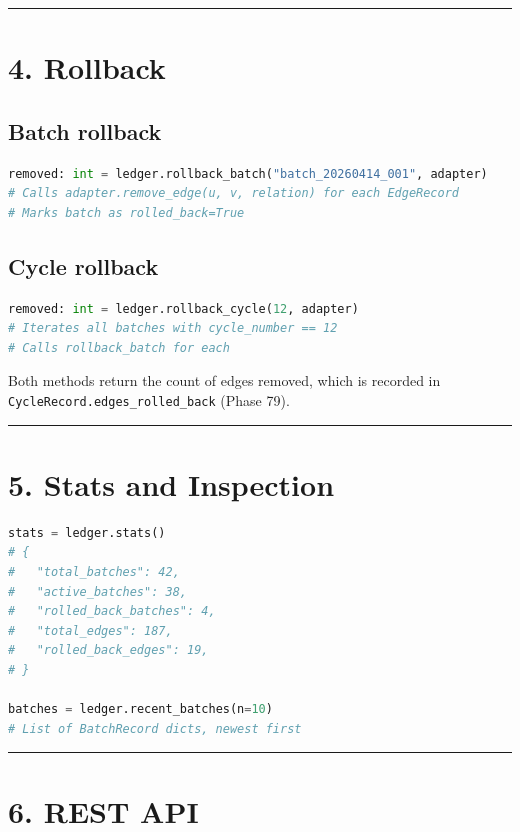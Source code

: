 \medskip\noindent\rule{\linewidth}{0.4pt}\medskip

\section*{4. Rollback}

\subsection*{Batch rollback}
\begin{lstlisting}[language=Python]
removed: int = ledger.rollback_batch("batch_20260414_001", adapter)
# Calls adapter.remove_edge(u, v, relation) for each EdgeRecord
# Marks batch as rolled_back=True
\end{lstlisting}

\subsection*{Cycle rollback}
\begin{lstlisting}[language=Python]
removed: int = ledger.rollback_cycle(12, adapter)
# Iterates all batches with cycle_number == 12
# Calls rollback_batch for each
\end{lstlisting}

Both methods return the count of edges removed, which is recorded in \texttt{CycleRecord.edges\_rolled\_back} (Phase 79).

\medskip\noindent\rule{\linewidth}{0.4pt}\medskip

\section*{5. Stats and Inspection}

\begin{lstlisting}[language=Python]
stats = ledger.stats()
# {
#   "total_batches": 42,
#   "active_batches": 38,
#   "rolled_back_batches": 4,
#   "total_edges": 187,
#   "rolled_back_edges": 19,
# }

batches = ledger.recent_batches(n=10)
# List of BatchRecord dicts, newest first
\end{lstlisting}

\medskip\noindent\rule{\linewidth}{0.4pt}\medskip

\section*{6. REST API}

